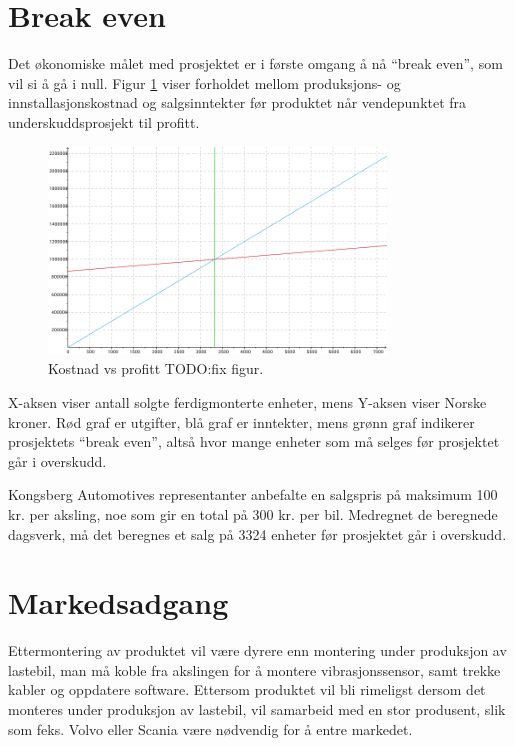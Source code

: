 \section{Break even}
Det økonomiske målet med prosjektet er i første omgang å nå ``break even'', 
som vil si å gå i null. Figur \ref{fig:breakeven} viser forholdet mellom 
produksjons- og innstallasjonskostnad og salgsinntekter før produktet når 
vendepunktet fra underskuddsprosjekt til profitt. 
	\newline
	\begin{figure}[H]
		\centering
		\includegraphics[width=0.80\textwidth]{images/break-even.png}
		\caption{Kostnad vs profitt TODO:fix figur.}
		\label{fig:breakeven}
	\end{figure}
X-aksen viser antall solgte ferdigmonterte enheter, mens Y-aksen viser 
Norske kroner. Rød graf er utgifter, blå graf er inntekter, mens grønn graf 
indikerer prosjektets ``break even'', altså hvor mange enheter som må selges 
før prosjektet går i overskudd.

Kongsberg Automotives representanter anbefalte en salgspris på maksimum 100 kr.
per aksling, noe som gir en total på 300 kr. per bil. Medregnet de beregnede 
dagsverk, må det beregnes et salg på 3324 enheter før prosjektet går i overskudd.

\section{Markedsadgang}
Ettermontering av produktet vil være dyrere enn montering under produksjon av 
lastebil, man må koble fra akslingen for å montere vibrasjonssensor, samt 
trekke kabler og oppdatere software. Ettersom produktet vil bli rimeligst 
dersom det monteres under produksjon av lastebil, vil  samarbeid med en stor 
produsent, slik som feks. Volvo eller Scania være nødvendig for å entre markedet. 

